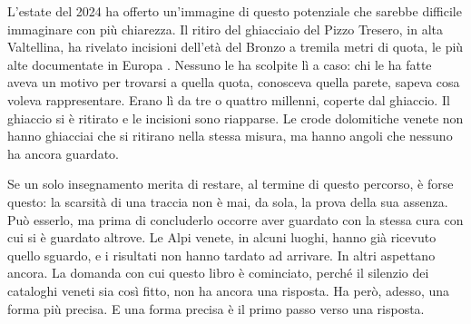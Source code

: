 L'estate del 2024 ha offerto un'immagine di questo potenziale che sarebbe difficile immaginare con più chiarezza. Il ritiro del ghiacciaio del Pizzo Tresero, in alta Valtellina, ha rivelato incisioni dell'età del Bronzo a tremila metri di quota, le più alte documentate in Europa \citep{tresero2024}. Nessuno le ha scolpite lì a caso: chi le ha fatte aveva un motivo per trovarsi a quella quota, conosceva quella parete, sapeva cosa voleva rappresentare. Erano lì da tre o quattro millenni, coperte dal ghiaccio. Il ghiaccio si è ritirato e le incisioni sono riapparse. Le crode dolomitiche venete non hanno ghiacciai che si ritirano nella stessa misura, ma hanno angoli che nessuno ha ancora guardato.

Se un solo insegnamento merita di restare, al termine di questo percorso, è forse questo: la scarsità di una traccia non è mai, da sola, la prova della sua assenza. Può esserlo, ma prima di concluderlo occorre aver guardato con la stessa cura con cui si è guardato altrove. Le Alpi venete, in alcuni luoghi, hanno già ricevuto quello sguardo, e i risultati non hanno tardato ad arrivare. In altri aspettano ancora. La domanda con cui questo libro è cominciato, perché il silenzio dei cataloghi veneti sia così fitto, non ha ancora una risposta. Ha però, adesso, una forma più precisa. E una forma precisa è il primo passo verso una risposta.
